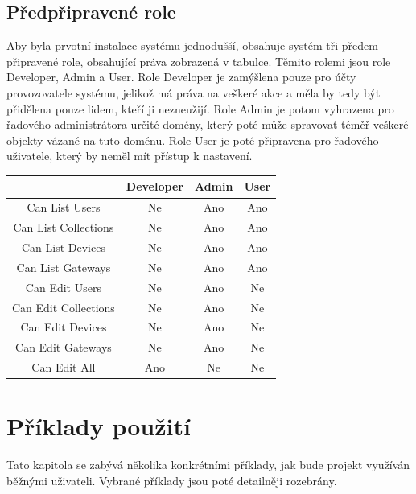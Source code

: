\subsection{Předpřipravené role}

Aby byla prvotní instalace systému jednodušší, obsahuje systém tři předem připravené role, obsahující práva zobrazená v tabulce. Těmito rolemi jsou role Developer, Admin a User. Role Developer je zamýšlena pouze pro účty provozovatele systému, jelikož má práva na veškeré akce a měla by tedy být přidělena pouze lidem, kteří ji nezneužijí. Role Admin je potom vyhrazena pro řadového administrátora určité domény, který poté může spravovat téměř veškeré objekty vázané na tuto doménu. Role User je poté připravena pro řadového uživatele, který by neměl mít přístup k nastavení.

\begin{tabular}{|c|c|c|c|}
\hline
 & Developer & Admin & User \\ \hline
Can List Users & Ne & Ano & Ano \\ \hline
Can List Collections & Ne & Ano & Ano \\ \hline
Can List Devices & Ne & Ano & Ano \\ \hline
Can List Gateways & Ne & Ano & Ano \\ \hline
Can Edit Users & Ne & Ano & Ne \\ \hline
Can Edit Collections & Ne & Ano & Ne \\ \hline
Can Edit Devices & Ne & Ano & Ne \\ \hline
Can Edit Gateways & Ne & Ano & Ne \\ \hline
Can Edit All & Ano & Ne & Ne \\ \hline
\end{tabular}

\section{Příklady použití}
Tato kapitola se zabývá několika konkrétními příklady, jak bude projekt využíván běžnými uživateli. Vybrané příklady jsou poté detailněji rozebrány. 

